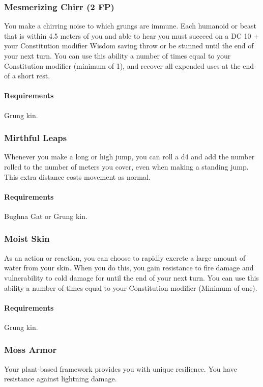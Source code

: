 \subsubsection{Mesmerizing Chirr (2 FP)} \label{feat::mesmerizingchirr}
    You make a chirring noise to which grungs are immune.
    Each humanoid or beast that is within 4.5 meters of you and able to hear you must succeed on a DC 10 + your Constitution modifier Wisdom saving throw or be stunned until the end of your next turn.
    You can use this ability a number of times equal to your Constitution modifier (minimum of 1), and recover all expended uses at the end of a short rest.
    \paragraph{Requirements} Grung kin.
\subsubsection{Mirthful Leaps} \label{feat::mirthfulleaps}
    Whenever you make a long or high jump, you can roll a d4 and add the number rolled to the number of meters you cover, even when making a standing jump.
    This extra distance costs movement as normal.
    \paragraph{Requirements} Bughna Gat or Grung kin.
\subsubsection{Moist Skin} \label{feat::moistskin}
    As an action or reaction, you can choose to rapidly excrete a large amount of water from your skin.
    When you do this, you gain resistance to fire damage and vulnerability to cold damage for until the end of your next turn.
    You can use this ability a number of times equal to your Constitution modifier (Minimum of one).
    \paragraph{Requirements} Grung kin.
\subsubsection{Moss Armor} \label{feat::mossarmor}
    Your plant-based framework provides you with unique resilience.
    You have resistance against lightning damage.

